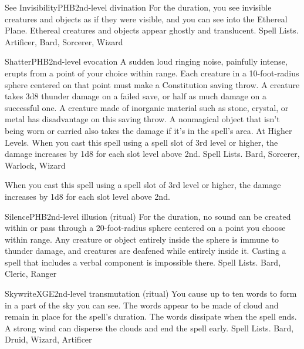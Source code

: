 \begin{spell}{See Invisibility}{PHB}{2nd-level divination}
{
}
For the duration, you see invisible creatures and objects as if they were visible, and you can see into the Ethereal Plane. Ethereal creatures and objects appear ghostly and translucent.
Spell Lists. Artificer, Bard, Sorcerer, Wizard
\end{spell}

\begin{spell}{Shatter}{PHB}{2nd-level evocation}
{
}
A sudden loud ringing noise, painfully intense, erupts from a point of your choice within range. Each creature in a 10-foot-radius sphere centered on that point must make a Constitution saving throw. A creature takes 3d8 thunder damage on a failed save, or half as much damage on a successful one. A creature made of inorganic material such as stone, crystal, or metal has disadvantage on this saving throw.
A nonmagical object that isn’t being worn or carried also takes the damage if it’s in the spell’s area.
At Higher Levels. When you cast this spell using a spell slot of 3rd level or higher, the damage increases by 1d8 for each slot level above 2nd.
Spell Lists. Bard, Sorcerer, Warlock, Wizard

 When you cast this spell using a spell slot of 3rd level or higher, the damage increases by 1d8 for each slot level above 2nd.
\end{spell}

\begin{spell}{Silence}{PHB}{2nd-level illusion (ritual)}
{
}
For the duration, no sound can be created within or pass through a 20-foot-radius sphere centered on a point you choose within range. Any creature or object entirely inside the sphere is immune to thunder damage, and creatures are deafened while entirely inside it. Casting a spell that includes a verbal component is impossible there.
Spell Lists. Bard, Cleric, Ranger
\end{spell}

\begin{spell}{Skywrite}{XGE}{2nd-level transmutation (ritual)}
{
}
You cause up to ten words to form in a part of the sky you can see. The words appear to be made of cloud and remain in place for the spell’s duration. The words dissipate when the spell ends. A strong wind can disperse the clouds and end the spell early.
Spell Lists. Bard, Druid, Wizard, Artificer
\end{spell}

